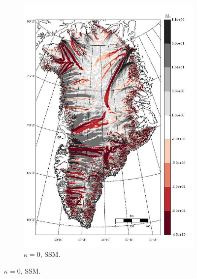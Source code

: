\begin{figure}
\begin{subfigure}[b]{0.25\linewidth}
    \includegraphics[width=\linewidth]{images/balance_velocity/greenland/d_U_ob/misfit_5H_kappa_0_SSM.jpg}
  \caption{$\kappa = 0$, SSM.}
  \label{greenland_bv_image_d_U_ob_kappa_5_SSM_misfit}
  \end{subfigure}


\end{figure}
